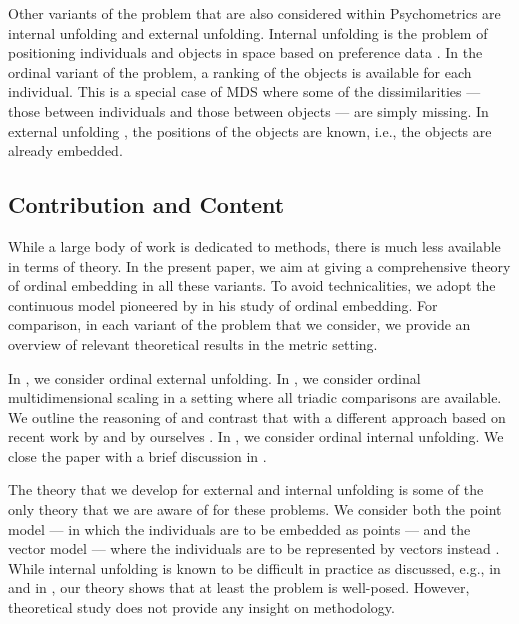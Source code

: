\documentclass[twoside, 11pt]{article}
\begin{document}
Other variants of the problem that are also considered within Psychometrics are internal unfolding and external unfolding. Internal unfolding is the problem of positioning individuals and objects in space based on preference data \cite{coombs1950psychological, bennett1956determination, tucker1960intra}. In the ordinal variant of the problem, a ranking of the objects is available for each individual. This is a special case of MDS where some of the dissimilarities --- those between individuals and those between objects --- are simply missing. 
In external unfolding \cite{gower1968adding, carroll1972individual, carroll1967}, the positions of the objects are known, i.e., the objects are already embedded. 

\subsection{Contribution and Content}
While a large body of work is dedicated to methods, there is much less available in terms of theory. In the present paper, we aim at giving a comprehensive theory of ordinal embedding in all these variants. To avoid technicalities, we adopt the continuous model pioneered by \citet{shepard1966metric} in his study of ordinal embedding. 
For comparison, in each variant of the problem that we consider, we provide an overview of relevant theoretical results in the metric setting. 

In , we consider ordinal external unfolding. 
In , we consider ordinal multidimensional scaling in a setting where all triadic comparisons are available. We outline the reasoning of \citet{shepard1966metric} and contrast that with a different approach based on recent work by \citet{klein} and by ourselves \cite{arias2017some}. 
In , we consider ordinal internal unfolding.
We close the paper with a brief discussion in .

The theory that we develop for external and internal unfolding is some of the only theory that we are aware of for these problems. We consider both the point model --- in which the individuals are to be embedded as points \cite{coombs1950psychological} --- and the vector model --- where the individuals are to be represented by vectors instead \cite{bennett1956determination, tucker1960intra}.
While internal unfolding is known to be difficult in practice as discussed, e.g., in \cite{busing2005avoiding} and in \cite[Ch 14, 15]{borg2005modern}, our theory shows that at least the problem is well-posed. However, theoretical study does not provide any insight on methodology.   
\end{document}
